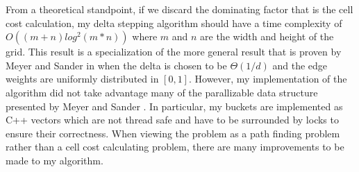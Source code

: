 \documentclass{article}
\begin{document}
From a theoretical standpoint, if we discard the dominating factor that is the cell cost
calculation, my delta stepping algorithm should have a time complexity of $O((m+n)log^2(m*n))$ where
\(m\) and \(n\) are the width and height of the grid. This result is a specialization of the more
general result that is proven by Meyer and Sander in \cite{Meyer-1998} when the delta is chosen to
be \(\Theta(1/d)\) and the edge weights are uniformly distributed in \([0, 1]\). However, my
implementation of the algorithm did not take advantage many of the parallizable data structure
presented by Meyer and Sander \cite{Meyer-1998}. In particular, my buckets are implemented as C++
vectors which are not thread safe and have to be surrounded by locks to ensure their correctness.
When viewing the problem as a path finding problem rather than a cell cost calculating problem,
there are many improvements to be made to my algorithm.

\printbibliography
\end{document}

